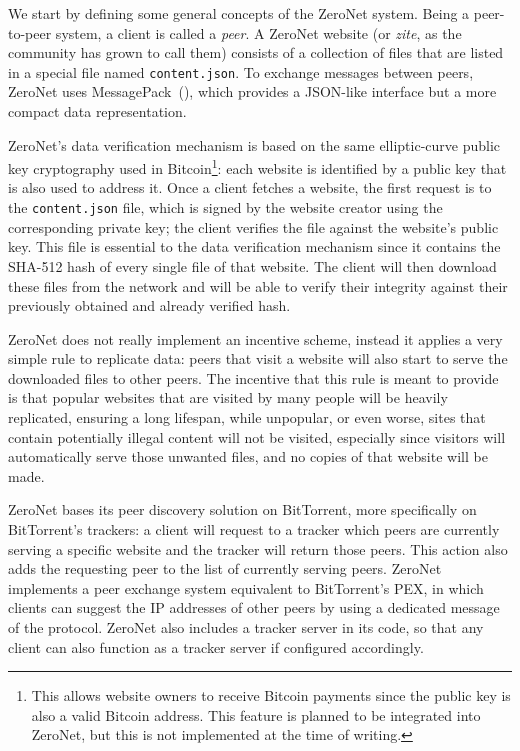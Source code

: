 \documentclass[mscthesis]{usiinfthesis}
\begin{document}
We start by defining some general concepts of the ZeroNet system. Being a peer-to-peer system, a client is called a \emph{peer}. A ZeroNet website (or \emph{zite}, as the community has grown to call them) consists of a collection of files that are listed in a special file named \texttt{content.json}. To exchange messages between peers, ZeroNet uses MessagePack~(\cite{website:msgpack}), which provides a JSON-like interface but a more compact data representation.


ZeroNet's data verification mechanism is based on the same elliptic-curve public key cryptography used in Bitcoin\footnote{This allows website owners to receive Bitcoin payments since the public key is also a valid Bitcoin address. This feature is planned to be integrated into ZeroNet, but this is not implemented at the time of writing.}: each website is identified by a public key that is also used to address it. Once a client fetches a website, the first request is to the \texttt{content.json} file, which is signed by the website creator using the corresponding private key; the client verifies the file against the website's public key. This file is essential to the data verification mechanism since it contains the SHA-512 hash of every single file of that website. The client will then download these files from the network and will be able to verify their integrity against their previously obtained and already verified hash.

ZeroNet does not really implement an incentive scheme, instead it applies a very simple rule to replicate data: peers that visit a website will also start to serve the downloaded files to other peers. The incentive that this rule is meant to provide is that popular websites that are visited by many people will be heavily replicated, ensuring a long lifespan, while unpopular, or even worse, sites that contain potentially illegal content will not be visited, especially since visitors will automatically serve those unwanted files, and no copies of that website will be made.

ZeroNet bases its peer discovery solution on BitTorrent, more specifically on BitTorrent's trackers: a client will request to a tracker which peers are currently serving a specific website and the tracker will return those peers. This action also adds the requesting peer to the list of currently serving peers. ZeroNet implements a peer exchange system equivalent to BitTorrent's PEX, in which clients can suggest the IP addresses of other peers by using a dedicated message of the protocol. ZeroNet also includes a tracker server in its code, so that any client can also function as a tracker server if configured accordingly.
\end{document}
